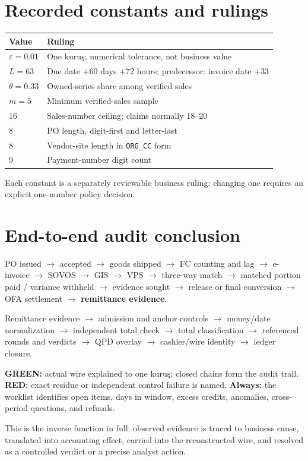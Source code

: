 \documentclass[11pt,a4paper]{article}
\newcommand{\eps}{\varepsilon}
\theoremstyle{definition}
\begin{document}
\section{Recorded constants and rulings}
\begin{center}
\begin{tabularx}{\textwidth}{@{}lX@{}}
\toprule
\textbf{Value} & \textbf{Ruling}\\
\midrule
$\eps=0.01$ & One kuruş; numerical tolerance, not business value\\
$L=63$ & Due date $+60$ days $+72$ hours; predecessor: invoice date $+33$\\
$\theta=0.33$ & Owned-series share among verified sales\\
$m=5$ & Minimum verified-sales sample\\
16 & Sales-number ceiling; claims normally 18--20\\
8 & PO length, digit-first and letter-last\\
8 & Vendor-site length in \texttt{ORG\_CC} form\\
9 & Payment-number digit count\\
\bottomrule
\end{tabularx}
\end{center}
Each constant is a separately reviewable business ruling; changing one
requires an explicit one-number policy decision.

\section{End-to-end audit conclusion}
\begin{center}
\begin{minipage}{0.94\textwidth}
\small
PO issued $\to$ accepted $\to$ goods shipped $\to$ FC counting and lag
$\to$ e-invoice $\to$ SOVOS $\to$ GIS $\to$ VPS $\to$ three-way match
$\to$ matched portion paid / variance withheld $\to$ evidence sought
$\to$ release or final conversion $\to$ OFA settlement $\to$
\textbf{remittance evidence}.

Remittance evidence $\to$ admission and anchor controls $\to$ money/date
normalization $\to$ independent total check $\to$ total classification
$\to$ referenced rounds and verdicts $\to$ QPD overlay $\to$
cashier/wire identity $\to$ ledger closure.

\textbf{GREEN:} actual wire explained to one kuruş; closed chains form
the audit trail. \textbf{RED:} exact residue or independent control
failure is named. \textbf{Always:} the worklist identifies open items,
days in window, excess credits, anomalies, cross-period questions, and
refusals.
\end{minipage}
\end{center}

This is the inverse function in full: observed evidence is traced to
business cause, translated into accounting effect, carried into the
reconstructed wire, and resolved as a controlled verdict or a precise
analyst action.
\end{document}
